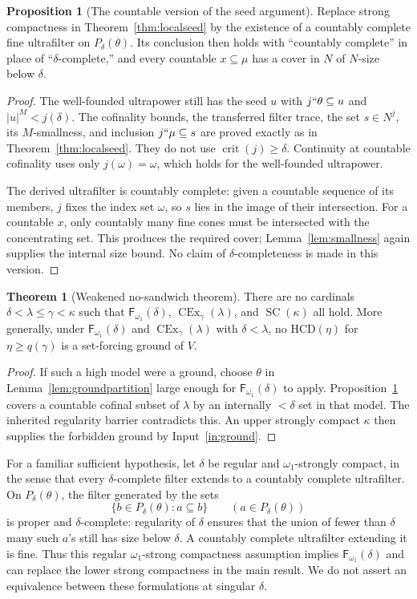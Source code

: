 \documentclass[11pt,letterpaper]{article}
\theoremstyle{definition}
\newtheorem{theorem}[definition]{Theorem}
\newtheorem{proposition}[definition]{Proposition}
\numberwithin{equation}{section}
\newcommand{\HCD}{\mathrm{HCD}}
\newcommand{\SC}{\operatorname{SC}}
\newcommand{\CEx}{\operatorname{CEx}}
\newcommand{\crit}{\operatorname{crit}}
\newcommand{\Ffine}{\mathsf{F}_{\omega_1}}
\begin{document}
\begin{proposition}[The countable version of the seed argument]\label{prop:weakseed}
Replace strong compactness in Theorem~\ref{thm:localseed} by the
existence of a countably complete fine ultrafilter on
$P_\delta(\theta)$. Its conclusion then holds with ``countably
complete'' in place of ``$\delta$-complete,'' and every countable
$x\subseteq\mu$ has a cover in $N$ of $N$-size below $\delta$.
\end{proposition}
\begin{proof}
The well-founded ultrapower still has the seed $u$ with
$j``\theta\subseteq u$ and $|u|^M<j(\delta)$. The cofinality bounds,
the transferred filter trace, the set $s\in N^j$, its $M$-smallness,
and inclusion $j``\mu\subseteq s$ are proved exactly as in
Theorem~\ref{thm:localseed}. They do not use
$\crit(j)\ge\delta$. Continuity at countable cofinality uses only
$j(\omega)=\omega$, which holds for the well-founded ultrapower.

The derived ultrafilter is countably complete: given a countable
sequence of its members, $j$ fixes the index set $\omega$, so $s$
lies in the image of their intersection. For a countable $x$, only
countably many fine cones must be intersected with the concentrating
set. This produces the required cover; Lemma~\ref{lem:smallness}
again supplies the internal size bound. No claim of
$\delta$-completeness is made in this version.
\end{proof}

\begin{theorem}[Weakened no-sandwich theorem]\label{thm:weakmain}
There are no cardinals $\delta<\lambda\le\gamma<\kappa$ such that
$\Ffine(\delta)$, $\CEx_\gamma(\lambda)$, and $\SC(\kappa)$ all hold.
More generally, under $\Ffine(\delta)$ and
$\CEx_\gamma(\lambda)$ with $\delta<\lambda$, no
$\HCD(\eta)$ for $\eta\ge q(\gamma)$ is a set-forcing ground of $V$.
\end{theorem}
\begin{proof}
If such a high model were a ground, choose $\theta$ in
Lemma~\ref{lem:groundpartition} large enough for $\Ffine(\delta)$
to apply. Proposition~\ref{prop:weakseed} covers a countable cofinal
subset of $\lambda$ by an internally $<\delta$ set in that model.
The inherited regularity barrier contradicts this. An upper strongly
compact $\kappa$ then supplies the forbidden ground by
Input~\ref{in:ground}.
\end{proof}

For a familiar sufficient hypothesis, let $\delta$ be regular and
$\omega_1$-strongly compact, in the sense that every $\delta$-complete
filter extends to a countably complete ultrafilter. On
$P_\delta(\theta)$, the filter generated by the sets
\[
\{b\in P_\delta(\theta):a\subseteq b\}
\qquad(a\in P_\delta(\theta))
\]
is proper and $\delta$-complete: regularity of $\delta$ ensures that
the union of fewer than $\delta$ many such $a$'s still has size below
$\delta$. A countably complete ultrafilter extending it is fine.
Thus this regular $\omega_1$-strong compactness assumption implies
$\Ffine(\delta)$ and can replace the lower strong compactness in the
main result. We do not assert an equivalence between these
formulations at singular $\delta$.
\end{document}
